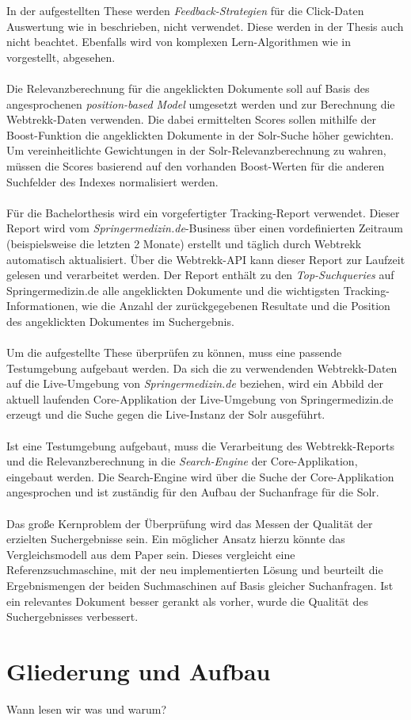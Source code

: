 In der aufgestellten These werden \textit{Feedback-Strategien} für die Click-Daten Auswertung wie in \cite{Joachims} beschrieben, nicht verwendet. Diese werden in der Thesis auch nicht beachtet. Ebenfalls wird von komplexen Lern-Algorithmen wie in \cite{IWUSBI} vorgestellt, abgesehen. 
\\
\\
Die Relevanzberechnung für die angeklickten Dokumente soll auf Basis des angesprochenen \textit{position-based Model} \cite{chuklin2015} umgesetzt werden und zur Berechnung die Webtrekk-Daten verwenden. Die dabei ermittelten Scores sollen mithilfe der Boost-Funktion die angeklickten Dokumente in der Solr-Suche höher gewichten. Um vereinheitlichte Gewichtungen in der Solr-Relevanzberechnung zu wahren, müssen die Scores basierend auf den vorhanden Boost-Werten für die anderen Suchfelder des Indexes normalisiert werden.
\\
\\
Für die Bachelorthesis wird ein vorgefertigter Tracking-Report verwendet. Dieser Report wird vom \textit{Springermedizin.de}-Business über einen vordefinierten Zeitraum (beispielsweise die letzten 2 Monate) erstellt und täglich durch Webtrekk automatisch aktualisiert. Über die Webtrekk-API kann dieser Report zur Laufzeit gelesen und verarbeitet werden. Der Report enthält zu den \textit{Top-Suchqueries} auf Springermedizin.de alle angeklickten Dokumente und die wichtigsten Tracking-Informationen, wie die Anzahl der zurückgegebenen Resultate und die Position des angeklickten Dokumentes im Suchergebnis.
\\
\\
Um die aufgestellte These überprüfen zu können, muss eine passende Testumgebung aufgebaut werden. Da sich die zu verwendenden Webtrekk-Daten auf die Live-Umgebung von \textit{Springermedizin.de} beziehen, wird ein Abbild der aktuell laufenden Core-Applikation der Live-Umgebung von Springermedizin.de erzeugt und die Suche gegen die Live-Instanz der Solr ausgeführt.
\\
\\
Ist eine Testumgebung aufgebaut, muss die Verarbeitung des Webtrekk-Reports und die Relevanzberechnung in die \textit{Search-Engine} der Core-Applikation, eingebaut werden. Die Search-Engine wird über die Suche der Core-Applikation angesprochen und ist zuständig für den Aufbau der Suchanfrage für die Solr.
\\
\\
Das große Kernproblem der Überprüfung wird das Messen der Qualität der erzielten Suchergebnisse sein. Ein möglicher Ansatz hierzu könnte das Vergleichsmodell aus dem Paper \cite{Hoppe2015} sein. Dieses vergleicht eine \glqq Referenzsuchmaschine\grqq{}, mit der neu implementierten Lösung und beurteilt die Ergebnismengen der beiden Suchmaschinen auf Basis gleicher Suchanfragen. Ist ein relevantes Dokument besser gerankt als vorher, wurde die Qualität des Suchergebnisses verbessert.

\section{Gliederung und Aufbau}
\label{sec:Einfuehrung:GliederungAufbau}

Wann lesen wir was und warum?
